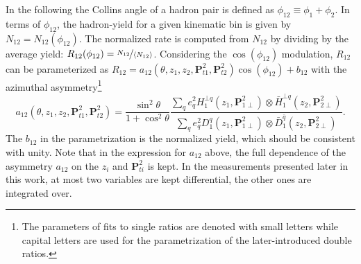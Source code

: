 \documentclass[aps,prX,preprint,groupedaddress,linenumbers]{revtex4-1}
\begin{document}
In the following the Collins angle of a hadron pair is defined as $\phi_{12} \equiv \phi_1+\phi_2$. In terms of $\phi_{12}$, the hadron-yield for a given kinematic bin is given by $N_{12}=N_{12}(\phi_{12})$. The normalized rate is computed from $N_{12}$ by dividing by the average yield: $R_{12}(\phi_{12})=\nicefrac{N_{12}}{\langle  N_{12}\rangle}$. Considering the $\cos(\phi_{12})$ modulation, $R_{12}$ can be parameterized as $R_{12}=a_{12}(\theta,z_1,z_2, \boldsymbol{P}^2_{t1},\boldsymbol{P}^2_{t2})\cos(\phi_{12})+b_{12}$ with the azimuthal asymmetry\footnote{The parameters of fits to single ratios are denoted with small letters while capital letters are used for the parametrization of the later-introduced double ratios.}
\begin{equation}
a_{12}(\theta,z_1,z_2, \boldsymbol{P}^2_{t1},\boldsymbol{P}^2_{t2})=\frac{\sin^2\theta}{1+\cos^2\theta}
\frac{\sum\limits_{q}e^2_qH^{\bot q}_1(z_1,\boldsymbol{P}^2_{1\perp})\otimes \bar{H}^{\bot q}_1(z_2,\boldsymbol{P}^2_{2\perp})}{\sum\limits_{q}e^2_qD^q_1(z_1,\boldsymbol{P}^2_{1\perp})\otimes \bar{D}^{\bar{q}}_1(z_2,\boldsymbol{P}^2_{2\perp})}.
\end{equation} 
The $b_{12}$ in the parametrization is the normalized yield, which should be consistent with unity.
Note that in the expression for $a_{12}$ above,  the full dependence of the asymmetry $a_{12}$ on the $z_i$ and $ \boldsymbol{P}^2_{ti}$ is kept. In the measurements presented later in this work,  at most two variables are kept differential, the other ones are integrated over.
\end{document}
